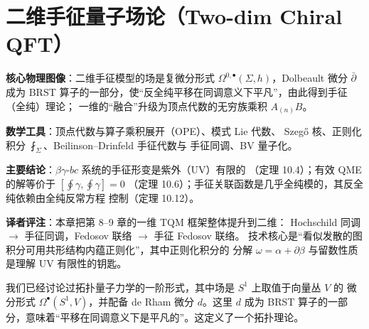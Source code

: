 

\section{二维手征量子场论（Two-dim Chiral QFT）}

\begin{keypoints}
  \item \textbf{核心物理图像}：二维手征模型的场是复微分形式
        $\Omega^{0,\bullet}(\Sigma,h)$，Dolbeault 微分 $\bar\partial$ 成为 BRST
        算子的一部分，使“反全纯平移在同调意义下平凡”，由此得到手征（全纯）理论；
        一维的“融合”升级为顶点代数的无穷族乘积 $A_{(n)}B$。
  \item \textbf{数学工具}：顶点代数与算子乘积展开（OPE）、模式 Lie 代数、
        Szegő 核、正则化积分 $\fint_\Sigma$、Beilinson--Drinfeld 手征代数与
        手征同调、BV 量子化。
  \item \textbf{主要结论}：$\beta\gamma$-$bc$ 系统的手征形变是紫外（UV）有限的
        （定理 10.4）；有效 QME 的解等价于 $[\oint\gamma,\oint\gamma]=0$
        （定理 10.6）；手征关联函数是几乎全纯模的，其反全纯依赖由全纯反常方程
        控制（定理 10.12）。
  \item \textbf{译者评注}：本章把第 8--9 章的一维 TQM 框架整体提升到二维：
        Hochschild 同调 $\to$ 手征同调，Fedosov 联络 $\to$ 手征 Fedosov 联络。
        技术核心是“看似发散的图积分可用共形结构内蕴正则化”，其中正则化积分的
        分解 $\omega=\alpha+\partial\beta$ 与留数性质是理解 UV 有限性的钥匙。
\end{keypoints}

我们已经讨论过拓扑量子力学的一阶形式，其中场是 $S^1$ 上取值于向量丛 $V$ 的
微分形式 $\Omega^\bullet(S^1,V)$，并配备 de Rham 微分 $d$。这里 $d$ 成为 BRST
算子的一部分，意味着“平移在同调意义下是平凡的”。这定义了一个拓扑理论。


